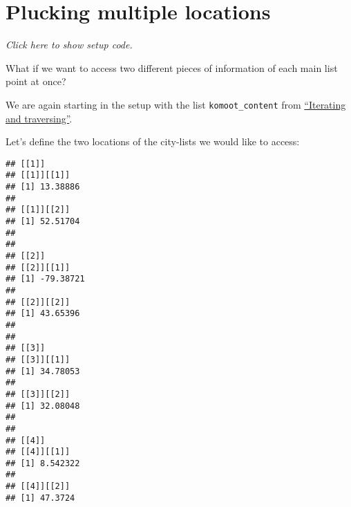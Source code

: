\documentclass[]{book}
\newenvironment{Shaded}{\begin{snugshade}}{\end{snugshade}}
\newcommand{\DecValTok}[1]{\textcolor[rgb]{0.00,0.00,0.81}{#1}}
\newcommand{\KeywordTok}[1]{\textcolor[rgb]{0.13,0.29,0.53}{\textbf{#1}}}
\newcommand{\NormalTok}[1]{#1}
\newcommand{\OperatorTok}[1]{\textcolor[rgb]{0.81,0.36,0.00}{\textbf{#1}}}
\newcommand{\StringTok}[1]{\textcolor[rgb]{0.31,0.60,0.02}{#1}}
\begin{document}
\hypertarget{multipluck}{%
\section{Plucking multiple locations}\label{multipluck}}

\emph{Click here to show setup code.}

\begin{Shaded}
\end{Shaded}

What if we want to access two different pieces of information of each main list point at once?

We are again starting in the setup with the list \texttt{komoot\_content} from \protect\hyperlink{komoot}{``Iterating and traversing''}.

Let's define the two locations of the city-lists we would like to access:

\begin{Shaded}
\end{Shaded}

\begin{verbatim}
## [[1]]
## [[1]][[1]]
## [1] 13.38886
## 
## [[1]][[2]]
## [1] 52.51704
## 
## 
## [[2]]
## [[2]][[1]]
## [1] -79.38721
## 
## [[2]][[2]]
## [1] 43.65396
## 
## 
## [[3]]
## [[3]][[1]]
## [1] 34.78053
## 
## [[3]][[2]]
## [1] 32.08048
## 
## 
## [[4]]
## [[4]][[1]]
## [1] 8.542322
## 
## [[4]][[2]]
## [1] 47.3724
\end{verbatim}

\begin{Shaded}
\end{Shaded}
\end{document}
